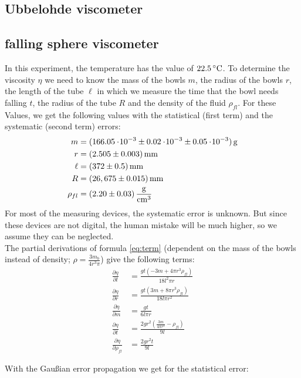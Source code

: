 \subsection{Ubbelohde viscometer}


\subsection{falling sphere viscometer}
In this experiment, the temperature has the value of $22.5\C$. To determine the viscosity $\eta$ we need to know the mass of the bowls $m$, the radius of the bowls $r$, the length of the tube $\ell$ in which we measure the time that the bowl needs falling $t$, the radius of the tube $R$ and the density of the fluid $\rho_{fl}$. For these Values, we get the following values with the statistical (first term) and the systematic (second term) errors:
\begin{align*}
m &= \unit[(166.05\e{-3} \pm 0.02 \e{-3} \pm 0.05\e{-3})]{g}\\
r &= \unit[(2.505 \pm 0.003)]{mm}\\
\ell &= \unit[(372 \pm 0.5)]{mm}\\
R &= \unit[(26,675 \pm 0.015)]{mm}\\
\rho_{fl} &= \unit[(2.20 \pm 0.03)]{\frac{g}{cm^3}}
\end{align*}
For most of the measuring devices, the systematic error is unknown. But since these devices are not digital, the human mistake will be much higher, so we assume they can be neglected. \\
The partial derivations of formula \ref{eq:term} (dependent on the mass of the bowls instead of density; $\rho = \frac{3m_b}{4r^3\pi}$) give the following terms:
\begin{align*}
\frac{\partial \eta}{\partial l}  &= \frac{g t \left(-3 m+4 \pi  r^3 \rho_{fl}\right)}{18 l^2 \pi  r}\\
\frac{\partial \eta}{\partial r} &= \frac{g t \left(3 m+8 \pi  r^3 \rho_{fl}\right)}{18 l \pi  r^2}\\
\frac{\partial \eta}{\partial m} &= \frac{g t}{6 l \pi  r}\\
\frac{\partial \eta}{\partial t} &= \frac{2 g r^2 \left(\frac{3 m}{4 \pi  r^3}- \rho_{fl}\right)}{9 l}\\
\frac{\partial \eta}{\partial \rho_{fl}} &= \frac{2 g r^2 t}{9 l}
\end{align*}

With the Gaußian error propagation we get for the statistical error:


